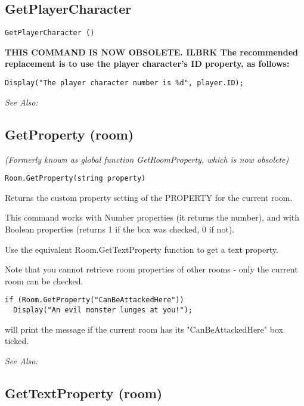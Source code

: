 \subsection{GetPlayerCharacter}\label{GetPlayerCharacter}%

\begin{verbatim}
GetPlayerCharacter ()
\end{verbatim}
\bf{THIS COMMAND IS NOW OBSOLETE.} ILBRK
The recommended replacement is to use the player character's ID property, as follows:

\begin{verbatim}
Display("The player character number is %d", player.ID);
\end{verbatim}

\it{See Also:} 


\subsection{GetProperty (room)}\label{Room.GetProperty}%

\it{(Formerly known as global function GetRoomProperty, which is now obsolete)}

\begin{verbatim}
Room.GetProperty(string property)
\end{verbatim}
Returns the custom property setting of the PROPERTY for the current room.

This command works with Number properties (it returns the number), and with Boolean
properties (returns 1 if the box was checked, 0 if not).

Use the equivalent Room.GetTextProperty function to get a text property.

Note that you cannot retrieve room properties of other rooms - only the current room
can be checked.

\begin{verbatim}
if (Room.GetProperty("CanBeAttackedHere"))
  Display("An evil monster lunges at you!");
\end{verbatim}
will print the message if the current room has its "CanBeAttackedHere" box ticked.

\it{See Also:} 


\subsection{GetTextProperty (room)}\label{Room.GetTextProperty}%

